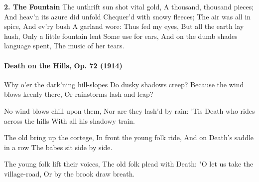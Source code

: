 \documentclass[11pt, ngermanm, titlepage]{article}
\begin{document}
\begin{multicols}{2}
	\textbf{2. The Fountain}\newline
	The unthrift sun shot vital gold,\newline
	A thousand, thousand pieces;\newline
	And heav'n its azure did unfold\newline
	Chequer'd with snowy fleeces;\newline
	The air was all in spice,\newline
	And ev'ry bush\newline
	A garland wore:\newline
	Thus fed my eyes,\newline
	But all the earth lay hush,\newline
	Only a little fountain lent\newline
	Some use for ears,\newline
	And on the dumb shades language spent,\newline
	The music of her tears.\newline
	
	\paragraph{Death on the Hills, Op. 72 (1914)\newline}
	Why o'er the dark'ning hill-slopes\newline
	Do dusky shadows creep?\newline
	Because the wind blows keenly there,\newline
	Or rainstorms lash and leap?\newline
	
	No wind blows chill upon them,\newline
	Nor are they lash'd by rain:\newline
	'Tis Death who rides across the hills\newline
	With all his shadowy train.\newline
	
	The old bring up the cortege,\newline
	In front the young folk ride,\newline
	And on Death's saddle in a row\newline
	The babes sit side by side.\newline
	
	The young folk lift their voices,\newline
	The old folk plead with Death:\newline
	"O let us take the village-road,\newline
	Or by the brook draw breath.\newline
	

\end{multicols}
\end{document}
